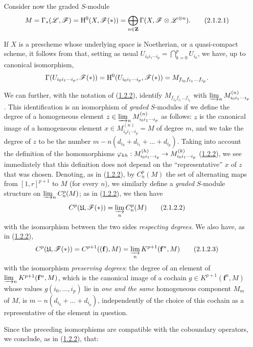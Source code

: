 \begin{env}[2.1.2]
\label{III.2.1.2}
Consider now the graded $S$-module 
\[
\label{III.2.1.2.1}
  M = \Gamma_*(\mathscr{L},\mathscr{F}) = \mathrm{H}^0(X,\mathscr{F}(*)) = \bigoplus_{n\in\mathbf{Z}} \Gamma(X,\mathscr{F}\otimes\mathscr{L}^{\otimes n}).
  \tag{2.1.2.1}
\]

If $X$ is a prescheme whose underlying space is Noetherian, or a quasi-compact scheme, it follows from  that, setting as usual $U_{i_0 i_1\cdots i_p} = \bigcap_{k=0}^p U_{i_k}$, we have, up to canonical isomorphism,
\[
  \Gamma(U_{i_0 i_1\cdots i_p},\mathscr{F}(*)) = \mathrm{H}^0(U_{i_0 i_1\cdots i_p},\mathscr{F}(*)) = M_{f_{i_0}f_{i_1}\ldots f_{i_p}}.
\]

We can further, with the notation of (\hyperref[III.1.2.2]{1.2.2}), identify $M_{f_{i_0}f_{i_1}\ldots f_{i_p}}$ with $\varinjlim_n M_{i_0 i_1\cdots i_p}^{(n)}$.
This identification is an isomorphism of \emph{graded} $S$-modules if we define the degree of a homogeneous element $z\in\varinjlim_n M_{i_0 i_1\cdots i_p}^{(n)}$ as follows: $z$ is the canonical image of a homogeneous element $x\in M_{i_0 i_1\cdots i_p}^{(n)} = M$ of degree $m$, and we take the degree of $z$ to be the number $m-n(d_{i_0}+d_{i_1}+\ldots+d_{i_p})$.
Taking into account the definition of the homomorphisms $\varphi_{kh}:M_{i_0 i_1\cdots i_p}^{(h)}\to M_{i_0 i_1\cdots i_p}^{(k)}$ (\hyperref[III.1.2.2]{1.2.2}), we see immediately that this definition does not depend on the ``representative'' $x$ of $z$ that was chosen.
Denoting, as in (\hyperref[III.1.2.2]{1.2.2}), by $C_n^p(M)$ the set of alternating maps from $[1,r]^{p+1}$ to $M$ (for every $n$), we similarly define a \emph{graded} $S$-module structure on $\varinjlim_n C_n^p(M)$; as in (\hyperref[III.1.2.2]{1.2.2}), we then have
\[
\label{III.2.1.2.2}
  C^p(\mathfrak{U},\mathscr{F}(*)) = \varinjlim_n C_n^p(M)
  \tag{2.1.2.2}
\]
with the isomorphism between the two sides \emph{respecting degrees}.
We also have, as in (\hyperref[III.1.2.2]{1.2.2}),
\[
\label{III.2.1.2.3}
  C^p(\mathfrak{U},\mathscr{F}(*)) = C^{p+1}((\mathbf{f}),M) = \varinjlim_n K^{p+1}(\mathbf{f}^n,M)
  \tag{2.1.2.3}
\]
with the isomorphism \emph{preserving degrees}: the degree of an element of $\varinjlim_n K^{p+1}(\mathbf{f}^n,M)$, which is the canonical image of a cochain $g\in K^{p+1}(\mathbf{f}^n,M)$ whose values $g(i_0,\dots,i_p)$ lie in \emph{one and the same} homogeneous component $M_m$ of $M$, is $m-n(d_{i_0}+\ldots+d_{i_p})$, independently of the choice of this cochain as a representative of the element in question.

Since the preceding isomorphisms are compatible with the coboundary operators, we conclude, as in (\hyperref[III.1.2.2]{1.2.2}), that:
\end{env}

